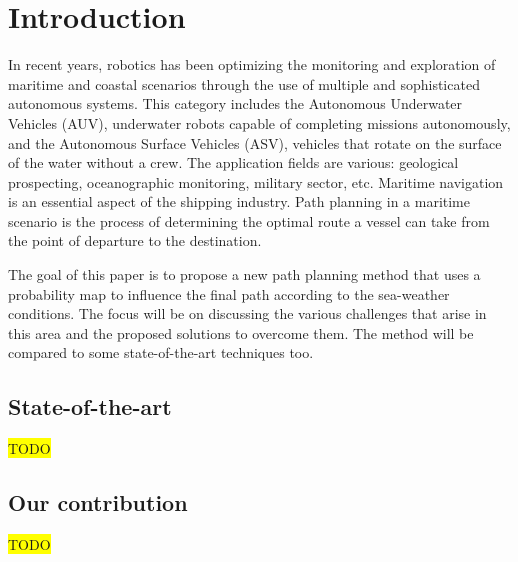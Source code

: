 \documentclass[journal,article,submit,pdftex,moreauthors]{Definitions/mdpi}
\begin{document}

\section{Introduction}
In recent years, robotics has been optimizing the monitoring and exploration of maritime and coastal scenarios through the use of multiple and sophisticated autonomous systems. This category includes the Autonomous Underwater Vehicles (AUV), underwater robots capable of completing missions autonomously, and the Autonomous Surface Vehicles (ASV), vehicles that rotate on the surface of the water without a crew. The application fields are various: geological prospecting, oceanographic monitoring, military sector, etc. Maritime navigation is an essential aspect of the shipping industry. Path planning in a maritime scenario is the process of determining the optimal route a vessel can take from the point of departure to the destination. 

The goal of this paper is to propose a new path planning method that uses a probability map to influence the final path according to the sea-weather conditions. The focus will be on discussing the various challenges that arise in this area and the proposed solutions to overcome them. The method will be compared to some state-of-the-art techniques too.


\subsection{State-of-the-art}
\colorbox{yellow}{TODO}


\subsection{Our contribution}
\colorbox{yellow}{TODO}
\end{document}
